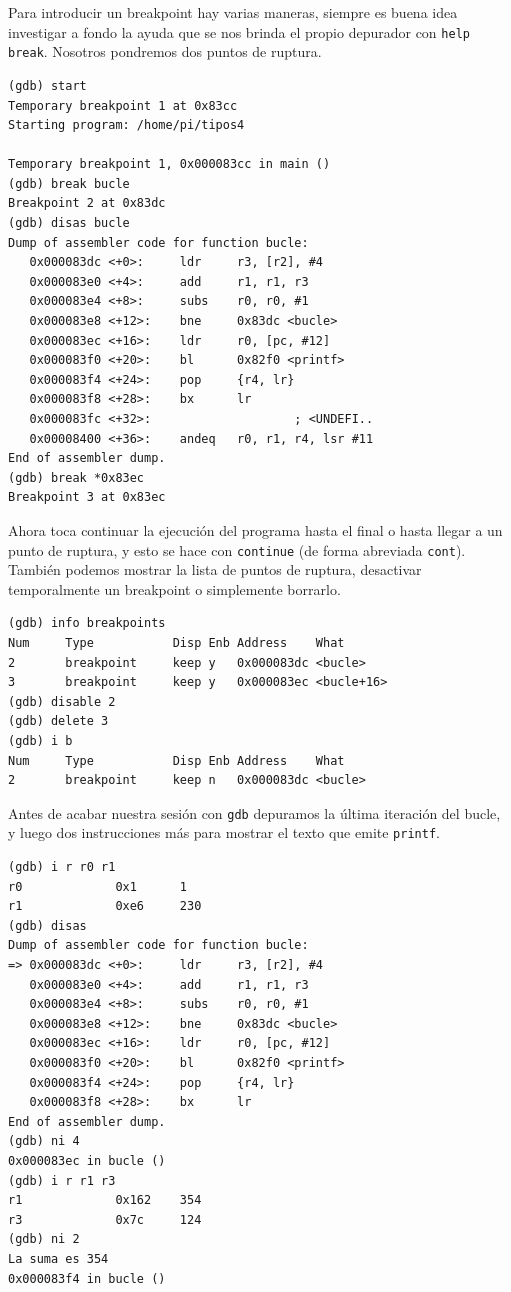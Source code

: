 Para introducir un breakpoint hay varias maneras, siempre es buena idea investigar a fondo
la ayuda que se nos brinda el propio depurador con {\tt help break}. Nosotros pondremos dos
puntos de ruptura.

\begin{lstlisting}
(gdb) start
Temporary breakpoint 1 at 0x83cc
Starting program: /home/pi/tipos4

Temporary breakpoint 1, 0x000083cc in main ()
(gdb) break bucle
Breakpoint 2 at 0x83dc
(gdb) disas bucle
Dump of assembler code for function bucle:
   0x000083dc <+0>:     ldr     r3, [r2], #4
   0x000083e0 <+4>:     add     r1, r1, r3
   0x000083e4 <+8>:     subs    r0, r0, #1
   0x000083e8 <+12>:    bne     0x83dc <bucle>
   0x000083ec <+16>:    ldr     r0, [pc, #12]
   0x000083f0 <+20>:    bl      0x82f0 <printf>
   0x000083f4 <+24>:    pop     {r4, lr}
   0x000083f8 <+28>:    bx      lr
   0x000083fc <+32>:                    ; <UNDEFI..
   0x00008400 <+36>:    andeq   r0, r1, r4, lsr #11
End of assembler dump.
(gdb) break *0x83ec
Breakpoint 3 at 0x83ec
\end{lstlisting}

Ahora toca continuar la ejecución del programa hasta el final o hasta llegar a
un punto de ruptura, y esto se hace con {\tt continue} (de forma abreviada {\tt cont}).
También podemos mostrar la lista de puntos de ruptura, desactivar temporalmente un breakpoint
o simplemente borrarlo.

\begin{lstlisting}
(gdb) info breakpoints
Num     Type           Disp Enb Address    What
2       breakpoint     keep y   0x000083dc <bucle>
3       breakpoint     keep y   0x000083ec <bucle+16>
(gdb) disable 2
(gdb) delete 3
(gdb) i b
Num     Type           Disp Enb Address    What
2       breakpoint     keep n   0x000083dc <bucle>
\end{lstlisting}

Antes de acabar nuestra sesión con {\tt gdb} depuramos la última iteración del bucle,
y luego dos instrucciones más para mostrar el texto que emite {\tt printf}.

\begin{lstlisting}
(gdb) i r r0 r1
r0             0x1      1
r1             0xe6     230
(gdb) disas
Dump of assembler code for function bucle:
=> 0x000083dc <+0>:     ldr     r3, [r2], #4
   0x000083e0 <+4>:     add     r1, r1, r3
   0x000083e4 <+8>:     subs    r0, r0, #1
   0x000083e8 <+12>:    bne     0x83dc <bucle>
   0x000083ec <+16>:    ldr     r0, [pc, #12]
   0x000083f0 <+20>:    bl      0x82f0 <printf>
   0x000083f4 <+24>:    pop     {r4, lr}
   0x000083f8 <+28>:    bx      lr
End of assembler dump.
(gdb) ni 4
0x000083ec in bucle ()
(gdb) i r r1 r3
r1             0x162    354
r3             0x7c     124
(gdb) ni 2
La suma es 354
0x000083f4 in bucle ()
\end{lstlisting}

